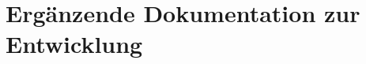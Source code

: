 \chapter{Ergänzende Dokumentation zur Entwicklung}
\label{appchap:add_doc_preparation}

\lipsum[1]



